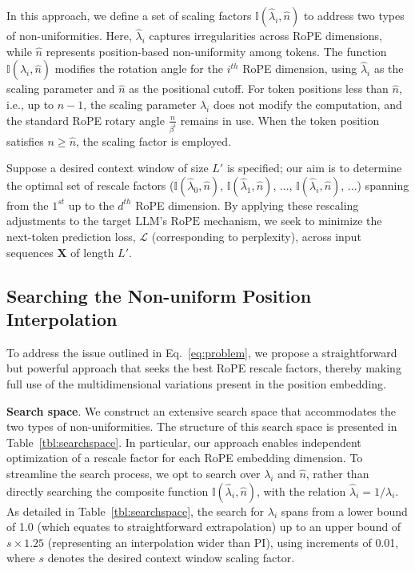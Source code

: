 In this approach, we define a set of scaling factors $\mathbb{I}(\hat{\lambda}_{i},\hat{n})$ to address two types of non-uniformities. Here, $\hat{\lambda}_i$ captures irregularities across RoPE dimensions, while $\hat{n}$ represents position-based non-uniformity among tokens. The function $\mathbb{I}(\hat{\lambda}_{i},\hat{n})$ modifies the rotation angle for the $i^{th}$ RoPE dimension, using $\hat{\lambda}_i$ as the scaling parameter and $\hat{n}$ as the positional cutoff. For token positions less than $\hat{n}$, i.e., up to $\hat{n}-1$, the scaling parameter $\hat{\lambda}_i$ does not modify the computation, and the standard RoPE rotary angle $\frac{n}{\beta^i}$ remains in use. When the token position satisfies $n \geq \hat{n}$, the scaling factor is employed.

Suppose a desired context window of size $L'$ is specified; our aim is to determine the optimal set of rescale factors ($\mathbb{I}(\hat{\lambda}_{0},\hat{n})$, $\mathbb{I}(\hat{\lambda}_{1},\hat{n})$, ..., $\mathbb{I}(\hat{\lambda}_{i},\hat{n})$, ...) spanning from the $1^{st}$ up to the $d^{th}$ RoPE dimension. By applying these rescaling adjustments to the target $\text{LLM}$'s $\text{RoPE}$ mechanism, we seek to minimize the next-token prediction loss, $\mathcal{L}$ (corresponding to perplexity), across input sequences $\mathbf{X}$ of length $L'$.

\subsection{Searching the Non-uniform Position Interpolation}

To address the issue outlined in Eq.~\ref{eq:problem}, we propose a straightforward but powerful approach that seeks the best RoPE rescale factors, thereby making full use of the multidimensional variations present in the position embedding.

\textbf{Search space}. We construct an extensive search space that accommodates the two types of non-uniformities. The structure of this search space is presented in Table~\ref{tbl:searchspace}. In particular, our approach enables independent optimization of a rescale factor for each RoPE embedding dimension. To streamline the search process, we opt to search over $\lambda_i$ and $\hat{n}$, rather than directly searching the composite function $\mathbb{I}(\hat{\lambda}_{i},\hat{n})$, with the relation $\hat{\lambda}_{i}=1/\lambda_i$. As detailed in Table~\ref{tbl:searchspace}, the search for $\lambda_i$ spans from a lower bound of 1.0 (which equates to straightforward extrapolation) up to an upper bound of $s\times1.25$ (representing an interpolation wider than PI), using increments of 0.01, where $s$ denotes the desired context window scaling factor.

